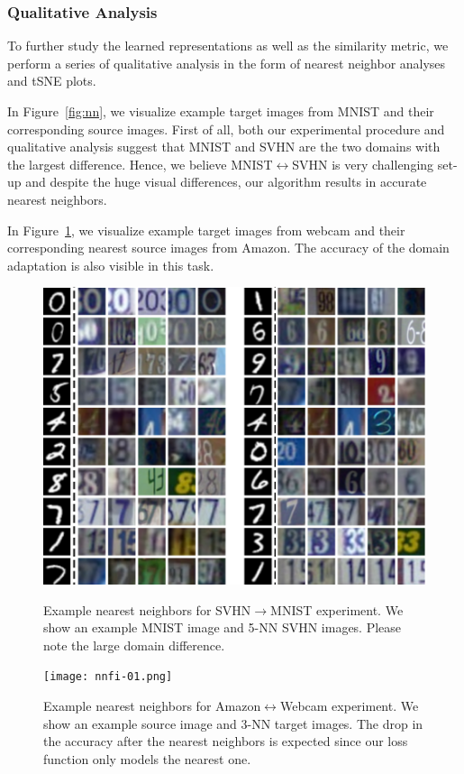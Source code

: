 \subsubsection{Qualitative Analysis}
To further study the learned representations as well as the similarity metric, we perform a series of qualitative analysis in the form of nearest neighbor analyses and tSNE\cite{tsne} plots.

In Figure~\ref{fig:nn}, we visualize example target images from MNIST and their corresponding source images. First of all, both our experimental procedure and qualitative analysis suggest that MNIST and SVHN are the two domains with the largest difference. Hence, we believe MNIST$\leftrightarrow$SVHN is very challenging set-up and despite the huge visual differences, our algorithm results in accurate nearest neighbors.

In Figure~\ref{fig:nnoffice},  we visualize example target images from webcam and their corresponding nearest source images from Amazon. The accuracy of the domain adaptation is also visible in this task. 

\begin{figure}[ht]
\begin{small}
\includegraphics[width=\columnwidth]{nndig}
\vspace{-5mm}
\caption{Example nearest neighbors for SVHN$\rightarrow$MNIST experiment. We show an example MNIST image and 5-NN SVHN images. Please note the large domain difference.}
\label{fig:nn}
\texttt{[image: nnfi-01.png]}
\caption{Example nearest neighbors for Amazon$\leftrightarrow$Webcam experiment. We show an example source image and 3-NN target images. The drop in the accuracy after the nearest neighbors is expected since our loss function only models the nearest one.}
\label{fig:nnoffice}
\end{small}
\end{figure}


